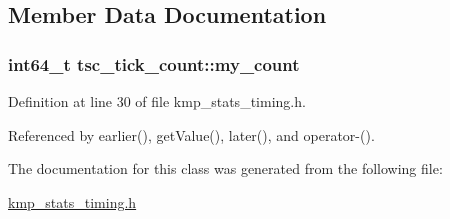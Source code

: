 \subsection{Member Data Documentation}
\hypertarget{classtsc__tick__count_ad3811672b7ec785fc23a9e33a33c9c84}{
\subsubsection[{my\-\_\-count}]{\setlength{\rightskip}{0pt plus 5cm}int64\-\_\-t tsc\-\_\-tick\-\_\-count\-::my\-\_\-count\hspace{0.3cm}{\ttfamily [private]}}}\label{classtsc__tick__count_ad3811672b7ec785fc23a9e33a33c9c84}


Definition at line 30 of file kmp\-\_\-stats\-\_\-timing.\-h.



Referenced by earlier(), get\-Value(), later(), and operator-\/().



The documentation for this class was generated from the following file\-:\begin{DoxyCompactItemize}
\item 
\hyperlink{kmp__stats__timing_8h}{kmp\-\_\-stats\-\_\-timing.\-h}\end{DoxyCompactItemize}

